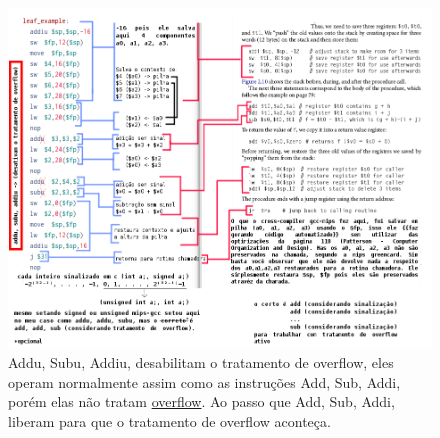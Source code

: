 \documentclass{article}
\begin{document}
\pagebreak
\begin{figure}[ht!]
  \centering
  \includegraphics[width=\linewidth]{leaf_example.png}
  \caption{Addu, Subu, Addiu, desabilitam o tratamento de overflow, eles operam
  normalmente assim como as instruções Add, Sub, Addi, porém elas não tratam
  \underline{overflow}. Ao passo que Add, Sub, Addi, liberam para que o
  tratamento de overflow aconteça.}
\end{figure}
\end{document}

